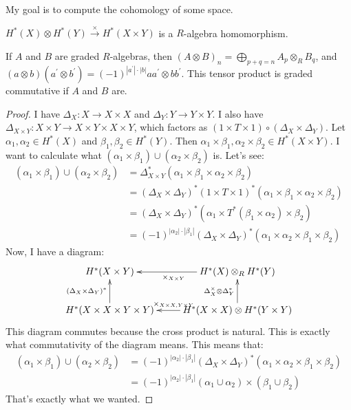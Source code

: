 My goal is to compute the cohomology of some space.
\begin{prop}
$ H^\ast(X)\otimes H^\ast(Y)\xrightarrow{\times} H^\ast(X\times Y)$ is a $R$-algebra homomorphism.
\end{prop}
If $A$ and $B$ are graded $R$-algebras, then $(A\otimes B)_n=\bigoplus_{p+q=n}A_p\otimes_R B_q$, and $(a\otimes b)(a^\prime\otimes b^\prime)=(-1)^{|a^\prime|\cdot|b|}aa^\prime\otimes bb^\prime$. This tensor product is graded commutative if $A$ and $B$ are.
\begin{proof}
I have $\Delta_X:X\to X\times X$ and $\Delta_Y:Y\to Y\times Y$. I also have $\Delta_{X\times Y}:X\times Y\to X\times Y\times X\times Y$, which factors as $(1\times T\times 1)\circ(\Delta_X\times \Delta_Y)$. Let $\alpha_1,\alpha_2\in H^\ast(X)$ and $\beta_1,\beta_2\in H^\ast(Y)$. Then $\alpha_1\times \beta_1,\alpha_2\times\beta_2\in H^\ast(X\times Y)$. I want to calculate what $(\alpha_1\times\beta_1)\cup(\alpha_2\times\beta_2)$ is. Let's see:
\begin{align*}
(\alpha_1\times\beta_1)\cup(\alpha_2\times\beta_2) & = \Delta_{X\times Y}^\ast(\alpha_1\times\beta_1\times\alpha_2\times\beta_2)\\
& = (\Delta_X\times\Delta_Y)^\ast(1\times T\times 1)^\ast(\alpha_1\times\beta_1\times\alpha_2\times\beta_2)\\
& = (\Delta_X\times\Delta_Y)^\ast(\alpha_1\times T^\ast(\beta_1\times\alpha_2)\times\beta_2)\\
& = (-1)^{|\alpha_2|\cdot|\beta_1|}(\Delta_X\times\Delta_Y)^\ast(\alpha_1\times\alpha_2\times\beta_1\times\beta_2)
\end{align*}
Now, I have a diagram:
\begin{equation*}
\xymatrix{
	 H^\ast(X\times Y) & \ar[l]^{\times_{X\times Y}} H^\ast(X)\otimes_R H^\ast(Y)\\
	 H^\ast(X\times X\times Y\times Y)\ar[u]^{(\Delta_X\times\Delta_Y)^\ast} & H^\ast(X\times X)\otimes H^\ast(Y\times Y)\ar[l]_{\times_{X\times X,Y\times Y}}\ar[u]^{\Delta_X^\times\otimes\Delta_Y^\ast}
}
\end{equation*}
This diagram commutes because the cross product is natural. This is exactly what commutativity of the diagram means. This means that:
\begin{align*}
(\alpha_1\times\beta_1)\cup(\alpha_2\times\beta_2) & = (-1)^{|\alpha_2|\cdot|\beta_1|}(\Delta_X\times\Delta_Y)^\ast(\alpha_1\times\alpha_2\times\beta_1\times\beta_2)\\
& = (-1)^{|\alpha_2|\cdot|\beta_1|}(\alpha_1\cup\alpha_2)\times(\beta_1\cup\beta_2)
\end{align*}
That's exactly what we wanted.
\end{proof}
